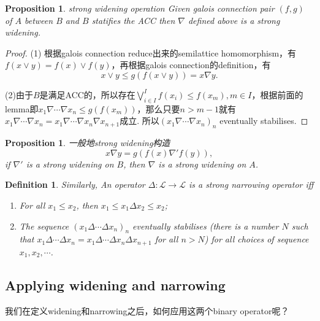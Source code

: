 \documentclass{article}
\newtheorem{proposition}[theorem]{Proposition}
\newtheorem{definition}[theorem]{Definition}
\newcommand*{\xfunc}[4]{{#2}\colon{#3}{#1}{#4}}
\newcommand*{\func}[3]{\xfunc{\to}{#1}{#2}{#3}}
\begin{document}
\begin{proposition}
\rm {\color{red} strong widening operation} Given galois connection pair $(f,g)$ of $A$ between $B$ and $B$ statifies the ACC then $\nabla$ defined above is a strong widening. 
\end{proposition}

\begin{proof}
(1) 根据galois connection reduce出来的semilattice homomorphism，有$f(x \vee y) = f(x) \vee f(y)$，再根据galois connection的definition，有
$$
 x \vee y \leq g(f(x \vee y)) = x \nabla y.
$$

(2)由于$B$是满足ACC的，所以存在$\bigvee\limits_{i \in I}^{I} f(x_i) \leq f(x_m), m \in I$，根据前面的lemma即$x_1 \nabla \cdots \nabla x_n \leq g(f(x_m))$，那么只要$n > m-1$就有$x_1 \nabla \cdots \nabla x_n = x_1 \nabla \cdots \nabla x_n \nabla x_{n+1}$成立. 所以$(x_1 \nabla \cdots \nabla x_n)_n$ eventually stabilises.
\end{proof}

\begin{proposition}
\rm {\color{red} 一般地strong widening构造}
$$
x \nabla y = g(f(x) \nabla' f(y)), 
$$
if $\nabla'$ is a strong widening on $B$, then $\nabla$ is a strong widening on $A$.
\end{proposition}

\begin{definition}
\rm Similarly, An operator $\func{\Delta}{\mathcal{L}}{\mathcal{L}}$ is a {\color{red} strong narrowing operator} iff
\begin{enumerate}
	\item For all $x_1 \leq x_2$, then $x_1 \leq x_1 \Delta x_2 \leq x_2$;
	\item The sequence $(x_1 \Delta \cdots \Delta x_n)_n$ eventually stabilises (there is a number $N$ such that $x_1 \Delta \cdots \Delta x_n = x_1 \Delta \cdots \Delta x_n \Delta x_{n+1}$ for all $n > N$) for all choices of sequence $x_1,x_2,\cdots$.
\end{enumerate}
\end{definition}

\newpage
\subsection{Applying widening and narrowing}

我们在定义widening和narrowing之后，如何应用这两个binary operator呢？ 
\end{document}
